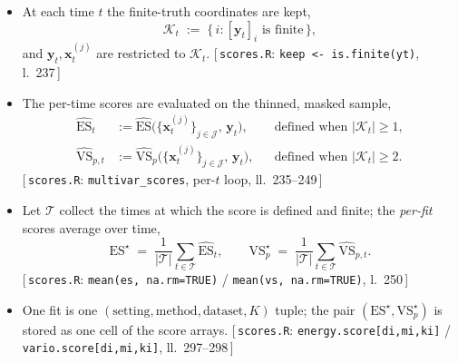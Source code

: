 \documentclass[11pt]{article}
\newcommand{\impl}[1]{{\footnotesize\textsf{\textcolor{blue!45!black}{[\,#1\,]}}}}
\begin{document}
\begin{itemize}[leftmargin=1.5em, itemsep=3pt]
  \item At each time $t$ the finite-truth coordinates are kept,
        \begin{equation}
          \mathcal K_t \;:=\;
            \{\, i : [\bm y_t]_i \text{ is finite}\,\},
        \end{equation}
        and $\bm y_t,\bm x_t^{(j)}$ are restricted to $\mathcal K_t$.
        \impl{\texttt{scores.R}: \texttt{keep <- is.finite(yt)}, l.~237}
  \item The per-time scores are evaluated on the thinned, masked sample,
        \begin{align}
          \widehat{\mathrm{ES}}_t
            &:= \widehat{\mathrm{ES}}\big(
                 \{\bm x_t^{(j)}\}_{j\in\mathcal J},\,\bm y_t\big),
            &&\text{defined when } |\mathcal K_t|\ge 1,
            \label{eq:es-t}\\[2pt]
          \widehat{\mathrm{VS}}_{p,t}
            &:= \widehat{\mathrm{VS}}_p\big(
                 \{\bm x_t^{(j)}\}_{j\in\mathcal J},\,\bm y_t\big),
            &&\text{defined when } |\mathcal K_t|\ge 2 .
            \label{eq:vs-t}
        \end{align}
        \impl{\texttt{scores.R}: \texttt{multivar\_scores}, per-$t$ loop, ll.~235--249}
  \item Let $\mathcal T$ collect the times at which the score is defined
        and finite; the \emph{per-fit} scores average over time,
        \begin{equation}
          \mathrm{ES}^\star
            \;=\; \frac{1}{|\mathcal T|}\sum_{t\in\mathcal T}
                  \widehat{\mathrm{ES}}_t,
          \qquad
          \mathrm{VS}_p^\star
            \;=\; \frac{1}{|\mathcal T|}\sum_{t\in\mathcal T}
                  \widehat{\mathrm{VS}}_{p,t}.
          \label{eq:perfit}
        \end{equation}
        \impl{\texttt{scores.R}: \texttt{mean(es, na.rm=TRUE)} / \texttt{mean(vs, na.rm=TRUE)}, l.~250}
  \item One fit is one $(\text{setting},\text{method},\text{dataset},K)$
        tuple; the pair $(\mathrm{ES}^\star,\mathrm{VS}_p^\star)$ is stored
        as one cell of the score arrays.
        \impl{\texttt{scores.R}: \texttt{energy.score[di,mi,ki]} / \texttt{vario.score[di,mi,ki]}, ll.~297--298}
\end{itemize}

\end{document}
